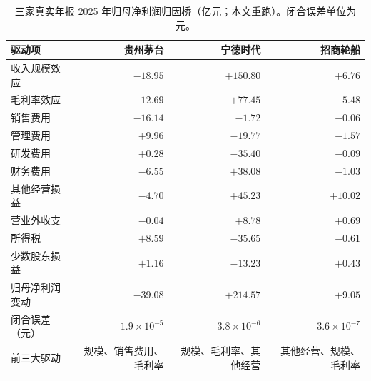 \begin{table}[t]
\centering
\caption{三家真实年报 2025 年归母净利润归因桥（亿元；本文重跑）。闭合误差单位为元。}
\label{tab:an-bridge-real}
\small
\begin{tabular}{lrrr}
\toprule
驱动项 & 贵州茅台 & 宁德时代 & 招商轮船 \\
\midrule
收入规模效应 & $-18.95$ & $+150.80$ & $+6.76$ \\
毛利率效应 & $-12.69$ & $+77.45$ & $-5.48$ \\
销售费用 & $-16.14$ & $-1.72$ & $-0.06$ \\
管理费用 & $+9.96$ & $-19.77$ & $-1.57$ \\
研发费用 & $+0.28$ & $-35.40$ & $-0.09$ \\
财务费用 & $-6.55$ & $+38.08$ & $-1.03$ \\
其他经营损益 & $-4.70$ & $+45.23$ & $+10.02$ \\
营业外收支 & $-0.04$ & $+8.78$ & $+0.69$ \\
所得税 & $+8.59$ & $-35.65$ & $-0.61$ \\
少数股东损益 & $+1.16$ & $-13.23$ & $+0.43$ \\
\midrule
归母净利润变动 & $-39.08$ & $+214.57$ & $+9.05$ \\
闭合误差（元） & $1.9\times10^{-5}$ & $3.8\times10^{-6}$ & $-3.6\times10^{-7}$ \\
前三大驱动 & 规模、销售费用、毛利率 & 规模、毛利率、其他经营 & 其他经营、规模、毛利率 \\
\bottomrule
\end{tabular}
\end{table}

